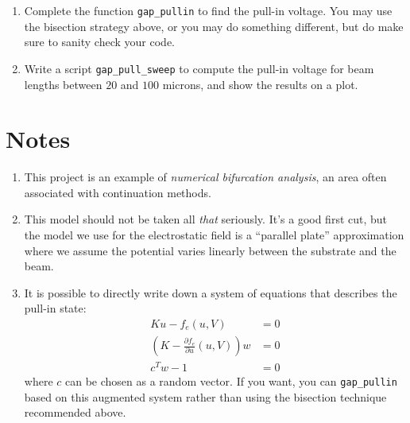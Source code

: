 \documentclass[12pt, leqno]{article} %
\begin{document}
\begin{enumerate}
\item Complete the function {\tt gap\_pullin} to find the pull-in
  voltage.  You may use the bisection strategy above, or you may do
  something different, but do make sure to sanity check your code.
\item Write a script {\tt gap\_pull\_sweep} to compute the pull-in
  voltage for beam lengths between $20$ and $100$ microns, and show
  the results on a plot.
\end{enumerate}

\section{Notes}

\begin{enumerate}
\item
  This project is an example of {\em numerical bifurcation analysis},
  an area often associated with continuation methods.
\item
  This model should not be taken all {\em that} seriously.  It's a
  good first cut, but the model we use for the electrostatic field
  is a ``parallel plate'' approximation where we assume the potential
  varies linearly between the substrate and the beam.
\item
  It is possible to directly write down a system of equations that
  describes the pull-in state:
  \begin{align*}
  Ku-f_e(u,V) &= 0 \\
  \left( K-\frac{\partial f_e}{\partial u}(u,V) \right) w &= 0 \\
  c^T w - 1 &= 0
  \end{align*}
  where $c$ can be chosen as a random vector.  If you want, you can
  {\tt gap\_pullin} based on this augmented system rather than using
  the bisection technique recommended above.
\end{enumerate}
\end{document}
